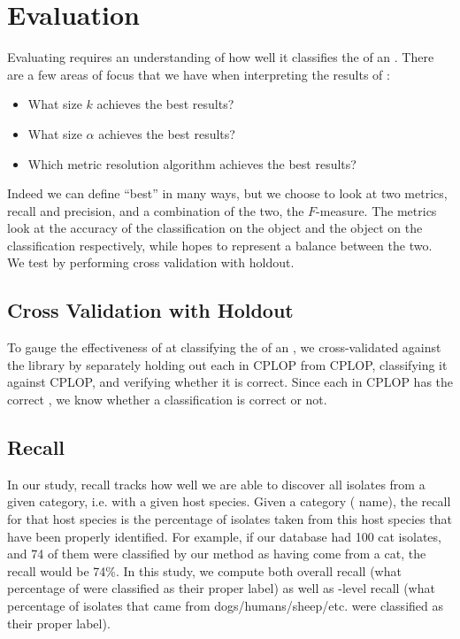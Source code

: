 \section{Evaluation}\label{sec:evaluation:krap}

Evaluating \krap{} requires an understanding of how well it classifies the \spec{} of an \isol{}.
There are a few areas of focus that we have when interpreting the results of \krap{}:
\begin{itemize}
\item What size $k$ achieves the best results?
\item What size $\alpha$ achieves the best results?
\item Which metric resolution algorithm achieves the best results?
\end{itemize}
Indeed we can define ``best'' in many ways, but we choose to look at two metrics, recall and precision, and a combination of the two, the $F$-measure. The metrics look at the accuracy of the classification on the object and the object on the classification respectively, while \fmeasure{} hopes to represent a balance between the two. 
We test \krap{} by performing cross validation with holdout.

\subsection{Cross Validation with Holdout}
To gauge the effectiveness of \krap{} at classifying the \spec{} of an \isol{}, we cross-validated against the library by separately holding out each \isol{} in CPLOP from CPLOP, classifying it against CPLOP, and verifying whether it is correct. 
Since each \isol{} in CPLOP has the correct \spec{}, we know whether a classification is correct or not.

\subsection{Recall}
In our study, recall tracks how well we are able to discover all isolates from a given category, i.e. with a given host species.
Given a category (\spec{} name), the recall for that host species is the percentage of isolates taken from this host species that have been properly identified.
For example, if our database had 100 cat isolates, and 74 of them were classified by our method as having come from a cat, the recall would be 74\%.
In this study, we compute both overall recall (what percentage of \isols{} were classified as their proper \spec{} label) as well as \spec{}-level recall (what percentage of isolates that came from dogs/humans/sheep/etc. were classified
as their proper label).

